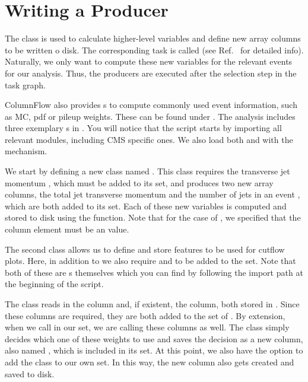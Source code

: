 \section{Writing a Producer}\label{sec:producer}

The  class is used to calculate higher-level variables and define new array columns to be written o disk. The corresponding task is called  (see Ref.~\cite{cf_repo} for detailed info). Naturally, we only want to compute these new variables for the relevant events for our analysis. Thus, the producers are executed after the selection step in the task graph. 

ColumnFlow also provides s to compute commonly used event information, such as MC, pdf or pileup weights. These can be found under . The  analysis includes three exemplary s in . You will notice that the script starts by importing all relevant modules, including CMS specific ones. We also load both  and  with the  mechanism.

We start by defining a new  class named . This class requires the transverse jet momentum , which must be added to its  set, and produces two new array columns, the total jet transverse momentum  and the number of jets in an event , which are both added to its  set. Each of these new variables is computed and stored to disk using the  function. Note that for the case of , we specified that the column element must be an  value.

The second  class  allows us to define and store features to be used for cutflow plots. Here, in addition to  we also require  and  to be added to the  set. Note that both of these are s themselves which you can find by following the import path at the beginning of the script. 

The   class  reads in the  column and, if existent, the  column, both stored in . Since these columns are required, they are both added to the  set of . By extension, when we call  in our  set, we are calling these columns as well. The  class simply decides which one of these weights to use and saves the decision as a new column, also named , which is included in its  set. At this point, we also have the option to add the  class to our own  set. In this way, the new column also gets created and saved to disk. 

